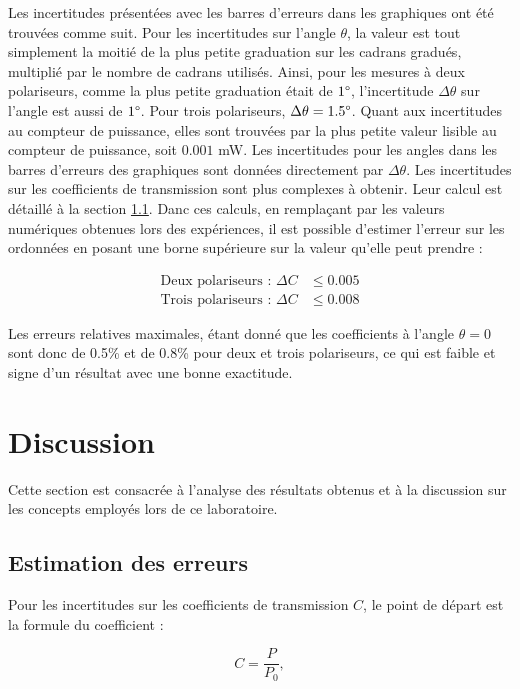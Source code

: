 \documentclass[11pt,letterpaper]{article}
\begin{document}
Les incertitudes présentées avec les barres d'erreurs dans les graphiques ont été trouvées comme suit.
Pour les incertitudes sur l'angle $\theta$, la valeur est tout simplement la moitié de la plus petite
graduation sur les cadrans gradués, multiplié par le nombre de cadrans utilisés. Ainsi, pour les
mesures à deux polariseurs, comme la plus petite graduation était de $1\degree$, l'incertitude 
$\Delta\theta$  sur l'angle est aussi de $1\degree$. Pour trois polariseurs, $\Delta\theta = 1.5\degree$.
Quant aux incertitudes au compteur de puissance, elles sont trouvées par la plus petite valeur lisible au
compteur de puissance, soit $0.001$ mW. Les incertitudes pour les angles dans les barres d'erreurs des graphiques sont données 
directement par $\Delta\theta$. Les incertitudes sur les coefficients de transmission sont plus complexes
à obtenir. Leur calcul est détaillé à la section \ref{inc}. Danc ces calculs, en remplaçant par les valeurs numériques obtenues 
lors des expériences, il est possible d'estimer l'erreur sur les ordonnées en posant une borne supérieure 
sur la valeur qu'elle peut prendre :

\begin{align*}
  \text{Deux polariseurs : }\Delta C &\leq 0.005\\ 
  \text{Trois polariseurs : }\Delta C &\leq 0.008
\end{align*}

Les erreurs relatives maximales, étant donné que les coefficients à l'angle $\theta= 0$ sont donc de 0.5\% et de 0.8\% pour deux et trois polariseurs, ce qui est faible et signe d'un résultat avec une bonne exactitude.

\section{Discussion}

Cette section est consacrée à l'analyse des résultats obtenus et à la discussion sur les concepts employés
lors de ce laboratoire.

\subsection{Estimation des erreurs}\label{inc}

Pour les incertitudes sur les coefficients de transmission $C$, le point de départ est la formule du coefficient :

\begin{equation}
  C = \frac{P}{P_{0}},
\end{equation}
\end{document}
